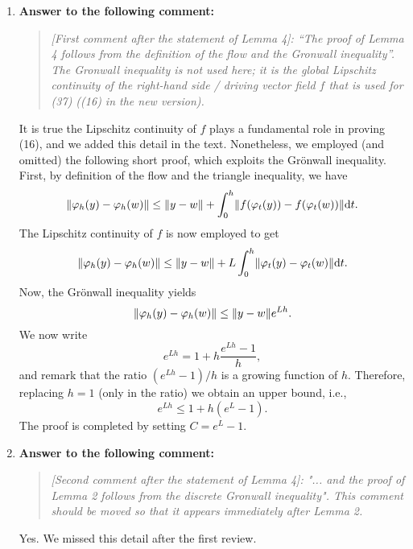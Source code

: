 \documentclass[10pt]{article}
\begin{document}
\begin{enumerate}
\item \textbf{Answer to the following comment:}
\begin{quote} \textit{[First comment after the statement of Lemma 4]: ``The proof of Lemma 4 follows from the definition of the flow and the Gronwall inequality''. The Gronwall inequality is not used here; it is the global Lipschitz continuity of the right-hand side / driving vector field $f$ that is used for (37) ((16) in the new version).} \end{quote}
It is true the Lipschitz continuity of $f$ plays a fundamental role in proving (16), and we added this detail in the text. Nonetheless, we employed (and omitted) the following short proof, which exploits the Grönwall inequality. First, by definition of the flow and the triangle inequality, we have
\begin{equation*}
	\lVert\varphi_h(y) - \varphi_h(w)\rVert \leq \lVert y - w\rVert + \int_0^h \lVert f(\varphi_t(y)) - f(\varphi_t(w))\rVert \mathrm{d} t.
\end{equation*}
The Lipschitz continuity of $f$ is now employed to get
\begin{equation*}
	\lVert\varphi_h(y) - \varphi_h(w)\rVert \leq \lVert y - w\rVert + L\int_0^h \lVert\varphi_t(y) - \varphi_t(w)\rVert \mathrm{d} t.
\end{equation*}
Now, the Grönwall inequality yields
\begin{equation*}
	\lVert\varphi_h(y) - \varphi_h(w)\rVert \leq \lVert y - w\rVert e^{Lh}.
\end{equation*}
We now write 
\begin{equation*}
	e^{Lh} = 1 + h\frac{e^{Lh} - 1}{h},
\end{equation*}
and remark that the ratio $(e^{Lh} - 1)/h$ is a growing function of $h$. Therefore, replacing $h = 1$ (only in the ratio) we obtain an upper bound, i.e.,
\begin{equation*}
	e^{Lh} \leq 1 + h(e^L - 1).
\end{equation*}
The proof is completed by setting $C = e^L - 1$.

\item \textbf{Answer to the following comment:}
\begin{quote} \textit{[Second comment after the statement of Lemma 4]: "... and the proof of Lemma 2 follows from the discrete Gronwall inequality". This comment should be moved so that it appears immediately after Lemma 2.} \end{quote}
Yes. We missed this detail after the first review.


\end{enumerate}
\end{document}
